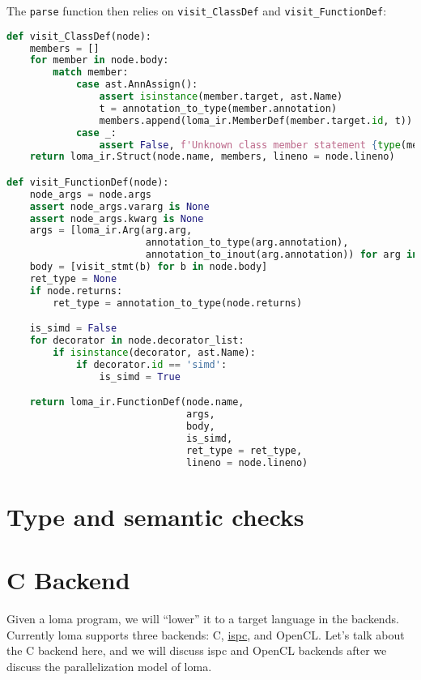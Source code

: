 The \lstinline{parse} function then relies on \lstinline{visit_ClassDef} and \lstinline{visit_FunctionDef}:
\begin{lstlisting}[language=Python]
def visit_ClassDef(node):
    members = []
    for member in node.body:
        match member:
            case ast.AnnAssign():
                assert isinstance(member.target, ast.Name)
                t = annotation_to_type(member.annotation)
                members.append(loma_ir.MemberDef(member.target.id, t))
            case _:
                assert False, f'Unknown class member statement {type(member).__name__}'
    return loma_ir.Struct(node.name, members, lineno = node.lineno)

def visit_FunctionDef(node):
    node_args = node.args
    assert node_args.vararg is None
    assert node_args.kwarg is None
    args = [loma_ir.Arg(arg.arg,
                        annotation_to_type(arg.annotation),
                        annotation_to_inout(arg.annotation)) for arg in node_args.args]
    body = [visit_stmt(b) for b in node.body]
    ret_type = None
    if node.returns:
        ret_type = annotation_to_type(node.returns)

    is_simd = False
    for decorator in node.decorator_list:
        if isinstance(decorator, ast.Name):
            if decorator.id == 'simd':
                is_simd = True

    return loma_ir.FunctionDef(node.name,
                               args,
                               body,
                               is_simd,
                               ret_type = ret_type,
                               lineno = node.lineno)
\end{lstlisting}

\section{Type and semantic checks}

\section{C Backend}

Given a loma program, we will ``lower'' it to a target language in the backends. Currently loma supports three backends: C, \href{https://ispc.github.io/index.html}{ispc}, and OpenCL. Let's talk about the C backend here, and we will discuss ispc and OpenCL backends after we discuss the parallelization model of loma.

